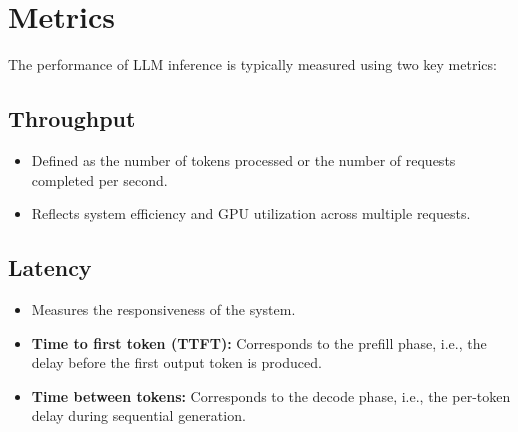 \section{Metrics}

The performance of LLM inference is typically measured using two key metrics:

\subsection{Throughput}
\begin{itemize}
    \item Defined as the number of tokens processed or the number of requests completed per second.
    \item Reflects system efficiency and GPU utilization across multiple requests.
\end{itemize}

\subsection{Latency}
\begin{itemize}
    \item Measures the responsiveness of the system.
    \item \textbf{Time to first token (TTFT):} Corresponds to the prefill phase, i.e., the delay before the first output token is produced.
    \item \textbf{Time between tokens:} Corresponds to the decode phase, i.e., the per-token delay during sequential generation.
\end{itemize}